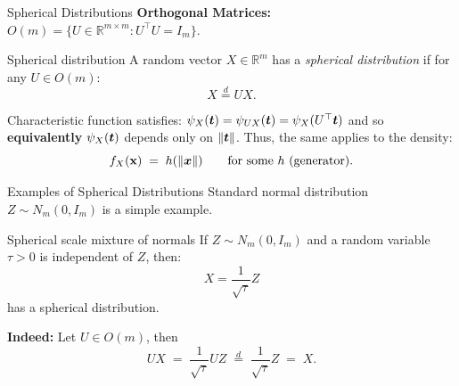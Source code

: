 \documentclass[11pt,handout,aspectratio=169]{beamer}
\begin{document}
\begin{frame}{Spherical Distributions}
\textbf{Orthogonal Matrices:} $O(m) = \{ U \in \mathbb{R}^{m \times m} : U^\top U = I_m \}$.
\begin{alertblock}{Spherical distribution}
A random vector $X \in \mathbb{R}^m$ has a \emph{spherical distribution} if for any $U \in O(m)$:
  \begin{equation*}
    X \overset{d}{=} U X.
  \end{equation*}	
\end{alertblock}
Characteristic function satisfies: $\psi_X(\boldsymbol t)=\psi_{UX}(\boldsymbol t)=\psi_X(U^\top \boldsymbol t)$ and so \textbf{equivalently} $\psi_X(\boldsymbol t)$ depends only on $\|\boldsymbol t\|$. Thus, the same applies to the density: $$f_X(\mathbf{x})\;=\;h(\|\boldsymbol x\|)\qquad\mbox{for some }h\mbox{ (generator)}.$$
  \end{frame}

\begin{frame}{Examples of Spherical Distributions}
Standard normal distribution $Z \sim N_m(0, I_m)$ is a simple example.
\bigskip

\begin{block}{Spherical scale mixture of normals}
	If $Z \sim N_m(0, I_m)$ and a random variable $\tau > 0$ is independent of $Z$, then:
      \begin{equation*}
        X = \frac{1}{\sqrt{\tau}} Z
      \end{equation*}
      has a spherical distribution.
\end{block}
  \textbf{Indeed:} Let $U \in O(m)$, then 
$$    UX \;=\; \frac{1}{\sqrt{\tau}} UZ \;\overset{d}{=}\; \frac{1}{\sqrt{\tau}} Z \;=\; X.$$
\end{frame}
\end{document}
